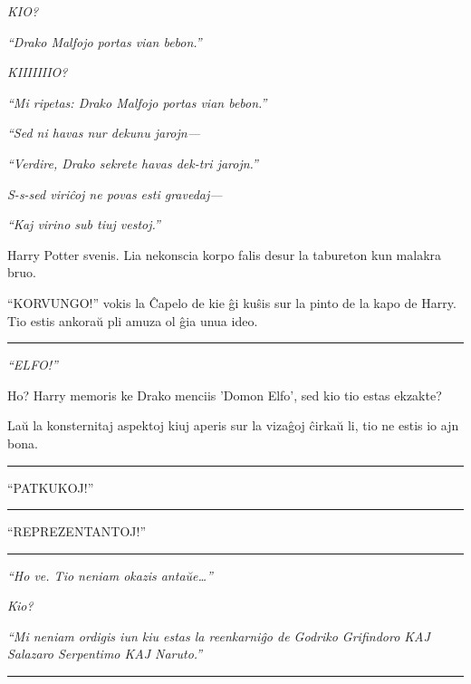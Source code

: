 \emph{KIO?}

\emph{``Drako Malfojo portas vian bebon.''}

\emph{KIIIIIIIO?}

\emph{``Mi ripetas: Drako Malfojo portas vian bebon.''}

\emph{``Sed ni havas nur dekunu jarojn—}

\emph{``Verdire, Drako sekrete havas dek-tri jarojn.''}

\emph{S-s-sed viriĉoj ne povas esti gravedaj—}

\emph{``Kaj virino sub tiuj vestoj.''}

\emph{}

\emph{}

Harry Potter svenis. Lia nekonscia korpo falis desur la tabureton kun
malakra bruo.

``KORVUNGO!'' vokis la Ĉapelo de kie ĝi kuŝis sur la pinto de la kapo
de Harry. Tio estis ankoraŭ pli amuza ol ĝia unua ideo.

\begin{center}\rule{3in}{0.4pt}\end{center}

\emph{``ELFO!''}

Ho? Harry memoris ke Drako menciis 'Domon Elfo', sed kio tio estas
ekzakte?

Laŭ la konsternitaj aspektoj kiuj aperis sur la vizaĝoj ĉirkaŭ li, tio
ne estis io ajn bona.

\begin{center}\rule{3in}{0.4pt}\end{center}

``PATKUKOJ!''

\begin{center}\rule{3in}{0.4pt}\end{center}

``REPREZENTANTOJ!''

\begin{center}\rule{3in}{0.4pt}\end{center}

\emph{``Ho ve. Tio neniam okazis antaŭe\ldots''}

\emph{Kio?}

\emph{``Mi neniam ordigis iun kiu estas la reenkarniĝo de Godriko
  Grifindoro KAJ Salazaro Serpentimo KAJ Naruto.''}

\begin{center}\rule{3in}{0.4pt}\end{center}


